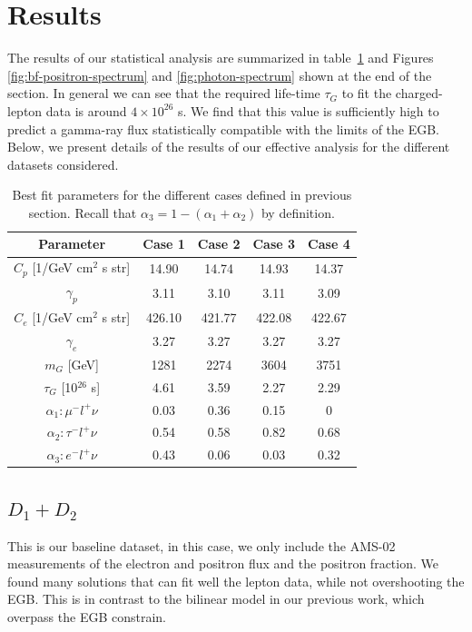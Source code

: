 \documentclass[a4paper,11pt]{article}
\begin{document}

\section{Results}
\label{sec:results}

The results of our statistical analysis are summarized in table~\ref{table:best-fit-summary} and Figures \ref{fig:bf-positron-spectrum} and \ref{fig:photon-spectrum} shown at the end of the section. In general we can see that the required life-time $\tau_G$ to fit the charged-lepton data is around $4\times 10^{26}$ s. We find that this value is sufficiently high to predict a gamma-ray flux statistically compatible with the limits of the EGB. Below, we present details of the results of our effective analysis for the different datasets considered.  

\begin{table}
\centering{}%
\begin{tabular}{|c|c|c|c|c|}
\hline 
 Parameter & Case 1 & Case 2 & Case 3 & Case 4 \tabularnewline
\hline 
\hline 
$C_p$ [1/GeV cm$^2$ s str] & 14.90 & 14.74 & 14.93 & 14.37 \tabularnewline
\hline 
$\gamma_p$ & 3.11 & 3.10 & 3.11 & 3.09  \tabularnewline
\hline 
$C_e$ [1/GeV cm$^2$ s str] & 426.10 & 421.77 & 422.08 & 422.67 \tabularnewline
\hline 
$\gamma_e$ & 3.27 & 3.27 & 3.27 & 3.27 \tabularnewline
\hline 
$m_G$ [GeV] & 1281 & 2274 & 3604 & 3751 \tabularnewline
\hline 
$\tau_G$ [10$^{26}$ s] & 4.61 & 3.59 & 2.27 & 2.29  \tabularnewline
\hline 
$\alpha_1: \mu^-l^+\nu $  & 0.03 &  0.36 & 0.15 &  0 \tabularnewline
\hline 
$\alpha_2: \tau^-l^+\nu$  & 0.54 &  0.58 & 0.82 & 0.68 \tabularnewline
\hline
\hline
$\alpha_3: e^-l^+\nu$  & 0.43 &  0.06 & 0.03 & 0.32 \tabularnewline
\hline 
\end{tabular}
\caption{Best fit parameters for the different cases defined in previous section. Recall that $\alpha_3= 1-(\alpha_1+\alpha_2)$ by definition.}
\label{table:best-fit-summary}
\end{table}

\subsection{$D_1 + D_2$}

This is our baseline dataset, in this case, we only include the AMS-02 measurements of the electron and positron flux and the positron fraction. We found many solutions that can fit well the lepton data, while not overshooting the EGB. This is in contrast to the bilinear model in our previous work, which overpass the EGB constrain. 
\end{document}
